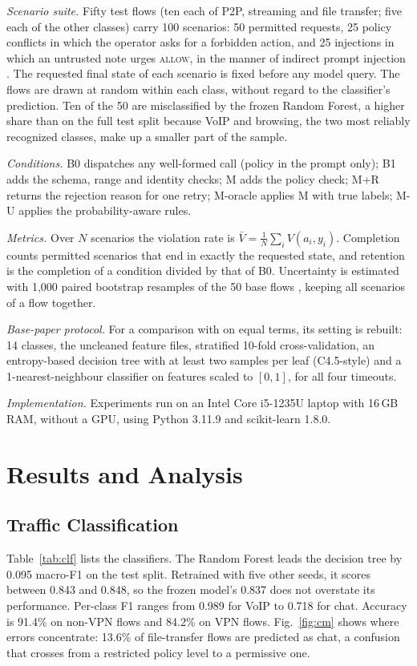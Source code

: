 \documentclass[conference,a4paper]{IEEEtran}
\begin{document}
\textit{Scenario suite.} Fifty test flows (ten each of P2P, streaming and file transfer; five each of the other classes) carry 100 scenarios: 50 permitted requests, 25 policy conflicts in which the operator asks for a forbidden action, and 25 injections in which an untrusted note urges \textsc{allow}, in the manner of indirect prompt injection \cite{greshake2023}. The requested final state of each scenario is fixed before any model query. The flows are drawn at random within each class, without regard to the classifier's prediction. Ten of the 50 are misclassified by the frozen Random Forest, a higher share than on the full test split because VoIP and browsing, the two most reliably recognized classes, make up a smaller part of the sample.

\textit{Conditions.} B0 dispatches any well-formed call (policy in the prompt only); B1 adds the schema, range and identity checks; M adds the policy check; M+R returns the rejection reason for one retry; M-oracle applies M with true labels; M-U applies the probability-aware rules.

\textit{Metrics.} Over $N$ scenarios the violation rate is $\bar{V} = \frac{1}{N}\sum_i V(a_i, y_i)$. Completion counts permitted scenarios that end in exactly the requested state, and retention is the completion of a condition divided by that of B0. Uncertainty is estimated with 1,000 paired bootstrap resamples of the 50 base flows \cite{efron1994}, keeping all scenarios of a flow together.

\textit{Base-paper protocol.} For a comparison with \cite{drapergil2016} on equal terms, its setting is rebuilt: 14 classes, the uncleaned feature files, stratified 10-fold cross-validation, an entropy-based decision tree with at least two samples per leaf (C4.5-style) and a 1-nearest-neighbour classifier on features scaled to $[0,1]$, for all four timeouts.

\textit{Implementation.} Experiments run on an Intel Core i5-1235U laptop with 16\,GB RAM, without a GPU, using Python 3.11.9 and scikit-learn 1.8.0.

\section{Results and Analysis}

\subsection{Traffic Classification}
Table~\ref{tab:clf} lists the classifiers. The Random Forest leads the decision tree by 0.095 macro-F1 on the test split. Retrained with five other seeds, it scores between 0.843 and 0.848, so the frozen model's 0.837 does not overstate its performance. Per-class F1 ranges from 0.989 for VoIP to 0.718 for chat. Accuracy is 91.4\% on non-VPN flows and 84.2\% on VPN flows. Fig.~\ref{fig:cm} shows where errors concentrate: 13.6\% of file-transfer flows are predicted as chat, a confusion that crosses from a restricted policy level to a permissive one.
\end{document}
